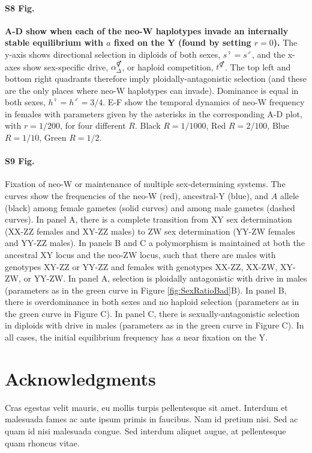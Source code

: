 \documentclass[10pt,letterpaper]{article}
\begin{document}
\paragraph*{S8 Fig.}
\label{fig:regionPloidAntag}
{\bf A-D show when each of the neo-W haplotypes invade an internally stable equilibrium with $a$ fixed on the Y (found by setting $r=0$).}
The y-axis shows directional selection in diploids of both sexes, $s^\female=s^\male$, and the x-axes show sex-specific drive, $\alpha_\Delta^\Hermaphrodite$, or haploid competition, $t^\Hermaphrodite$.
The top left and bottom right quadrants therefore imply ploidally-antagonistic selection (and these are the only places where neo-W haplotypes can invade).
Dominance is equal in both sexes, $h^\female=h^\male=3/4$. 
E-F show the temporal dynamics of neo-W frequency in females with parameters given by the asterisks in the corresponding A-D plot, with $r=1/200$, for four different $R$.
Black $R=1/1000$, Red $R=2/100$, Blue $R=1/10$, Green $R=1/2$.  

\paragraph*{S9 Fig.}
\label{fig:freqAll}
Fixation of neo-W or maintenance of multiple sex-determining systems. 
The curves show the frequencies of the neo-W (red), ancestral-Y (blue), and $A$ allele (black) among female gametes (solid curves) and among male gametes (dashed curves). 
In panel A, there is a complete transition from XY sex determination (XX-ZZ females and XY-ZZ males) to ZW sex determination (YY-ZW females and YY-ZZ males).  
In panels B and C a polymorphism is maintained at both the ancestral XY locus and the neo-ZW locus, such that there are males with genotypes XY-ZZ or YY-ZZ and females with genotypes XX-ZZ, XX-ZW, XY-ZW, or YY-ZW. 
In panel A, selection is ploidally antagonistic with drive in males (parameters as in the green curve in Figure \ref{fig:SexRatioBad}B).
In panel B, there is overdominance in both sexes and no haploid selection (parameters as in the green curve in Figure C).
In panel C, there is sexually-antagonistic selection in diploids with drive in males (parameters as in the green curve in Figure C).
In all cases, the initial equilibrium frequency has $a$ near fixation on the Y.

\section*{Acknowledgments}
Cras egestas velit mauris, eu mollis turpis pellentesque sit amet. Interdum et malesuada fames ac ante ipsum primis in faucibus. Nam id pretium nisi. Sed ac quam id nisi malesuada congue. Sed interdum aliquet augue, at pellentesque quam rhoncus vitae.
\end{document}
